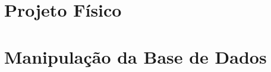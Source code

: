 \documentclass[a4paper,12pt]{article}
\begin{document}
	\section{Projeto Físico}
	
	
	
	\section{Manipulação da Base de Dados}
\end{document}
